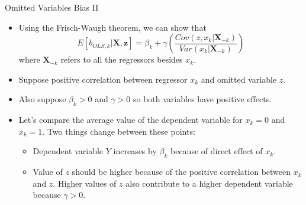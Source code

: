 \begin{frame}{Omitted Variables Bias II}
\begin{itemize}
	\item Using the Frisch-Waugh theorem, we can show that \[
E\left[b_{OLS,k}|\boldsymbol{X},\boldsymbol{z}\right]=\beta_{k}+\gamma\left(\frac{Cov\left(z,x_{k}|\boldsymbol{X}_{-k}\right)}{Var\left(x_{k}|\boldsymbol{X}_{-k}\right)}\right)
\]
where $\boldsymbol{X}_{-k}$ refers to all the regressors besides $x_k$.

	\item Suppose positive correlation between regressor $x_k$ and omitted variable $z$.
	\item Also suppose $\beta_k>0$ and $\gamma>0$ so both variables have positive effects.
	\item Let's compare the average value of the dependent variable for $x_k=0$ and $x_k=1$. Two
	things change between these points:
\begin{itemize}
	\item Dependent variable $Y$ increases by $\beta_k$ because of direct effect of $x_k$.
	\item Value of $z$ should be higher because of the positive correlation between $x_k$ and $z$. 
	Higher values of $z$ also contribute to a higher dependent variable because $\gamma>0$. 
	\end{itemize}
\end{itemize}
\end{frame}



